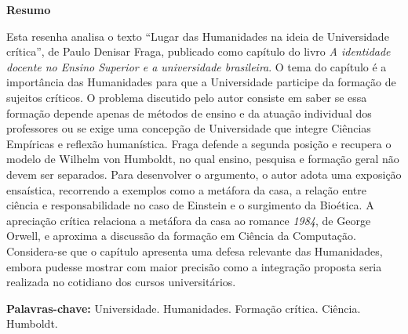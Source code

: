 \documentclass[12pt,a4paper]{article}
\begin{document}
\noindent\textbf{Resumo}\par
\noindent\setlength{\parindent}{0pt}%
Esta resenha analisa o texto ``Lugar das Humanidades na ideia de Universidade crítica'', de Paulo Denisar Fraga, publicado como capítulo do livro \textit{A identidade docente no Ensino Superior e a universidade brasileira}. O tema do capítulo é a importância das Humanidades para que a Universidade participe da formação de sujeitos críticos. O problema discutido pelo autor consiste em saber se essa formação depende apenas de métodos de ensino e da atuação individual dos professores ou se exige uma concepção de Universidade que integre Ciências Empíricas e reflexão humanística. Fraga defende a segunda posição e recupera o modelo de Wilhelm von Humboldt, no qual ensino, pesquisa e formação geral não devem ser separados. Para desenvolver o argumento, o autor adota uma exposição ensaística, recorrendo a exemplos como a metáfora da casa, a relação entre ciência e responsabilidade no caso de Einstein e o surgimento da Bioética. A apreciação crítica relaciona a metáfora da casa ao romance \textit{1984}, de George Orwell, e aproxima a discussão da formação em Ciência da Computação. Considera-se que o capítulo apresenta uma defesa relevante das Humanidades, embora pudesse mostrar com maior precisão como a integração proposta seria realizada no cotidiano dos cursos universitários.

\vspace{6pt}
\noindent\textbf{Palavras-chave:} Universidade. Humanidades. Formação crítica. Ciência. Humboldt.
\setlength{\parindent}{1.25cm}

\vspace{12pt}
\end{document}
